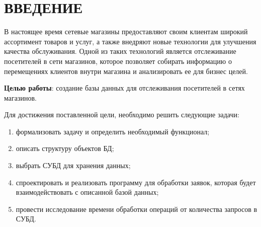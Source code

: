 \section*{ВВЕДЕНИЕ}

В настоящее время сетевые магазины предоставляют своим клиентам широкий ассортимент
товаров и услуг, а также внедряют новые технологии для улучшения качества обслуживания.
Одной из таких технологий является отслеживание посетителей в сети магазинов,
которое позволяет собирать информацию о перемещениях клиентов внутри магазина и анализировать
ее для бизнес целей.

\textbf{Целью работы}: создание базы данных для отслеживания посетителей в сетях магазинов.


Для достижения поставленной цели, необходимо решить следующие задачи:
\begin{enumerate}[label=\arabic*.]
	\item формализовать задачу и определить необходимый функционал;
	\item описать структуру объектов БД;
	\item выбрать СУБД для хранения данных;
	\item спроектировать и реализовать программу для обработки заявок, которая будет взаимодействовать с описанной базой данных; 
	\item провести исследование времени обработки операций от количества запросов в СУБД.
\end{enumerate}